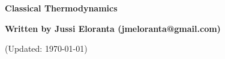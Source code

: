 \documentclass[serif]{beamer}
\begin{document}
\phantom{hauki}
\vfill
\begin{center}
\textbf{Classical Thermodynamics}\\

\vspace{1cm}

\textbf{Written by Jussi Eloranta (jmeloranta@gmail.com)}\\

\vspace{1cm}

{\tiny (Updated: \today)}

\end{center}
\vfill
\newpage


%
%
%
%
%

%
%
%

%
\end{document}
